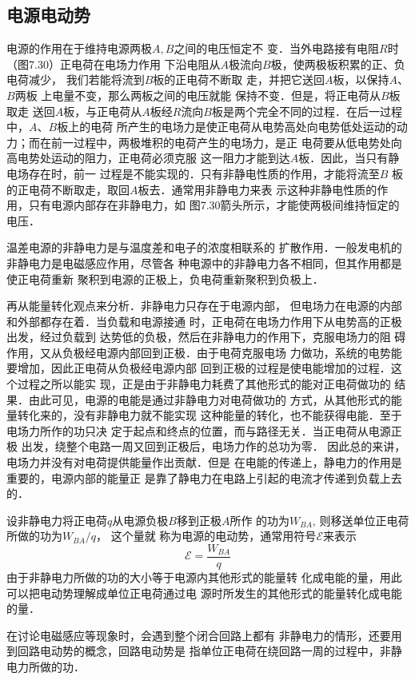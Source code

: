 \subsection{电源电动势}
电源的作用在于维持电源两极$A,B$之间的电压恒定不
变．当外电路接有电阻$R$时（图7.30）正电荷在电场力作用
下沿电阻从$A$极流向$B$极，使两极板积累的正、负电荷减少，
我们若能将流到$B$板的正电荷不断取
走，并把它送回$A$板，以保持$A$、$B$两板
上电量不变，那么两板之间的电压就能
保持不变．但是，将正电荷从$B$板取走
送回$A$板，与正电荷从$A$板经$R$流向$B$板是两个完全不同的过程．在后一过程中，$A$、$B$板上的电荷
所产生的电场力是使正电荷从电势高处向电势低处运动的动
力；而在前一过程中，两极堆积的电荷产生的电场力，是正
电荷要从低电势处向高电势处运动的阻力，正电荷必须克服
这一阻力才能到达$A$板．因此，当只有静电场存在时，前一
过程是不能实现的．只有非静电性质的作用，才能将流至$B$
板的正电荷不断取走，取回$A$板去．通常用非静电力来表
示这种非静电性质的作用，只有电源内部存在非静电力，如
图7.30箭头所示，才能使两极间维持恒定的电压．

温差电源的非静电力是与温度差和电子的浓度相联系的
扩散作用．一般发电机的非静电力是电磁感应作用，尽管各
种电源中的非静电力各不相同，但其作用都是使正电荷重新
聚积到电源的正极上，负电荷重新聚积到负极上．

再从能量转化观点来分析．非静电力只存在于电源内部，
但电场力在电源的内部和外部都存在着．当负载和电源接通
时，正电荷在电场力作用下从电势高的正极出发，经过负载到
达势低的负极，然后在非静电力的作用下，克服电场力的阻
碍作用，又从负极经电源内部回到正极．由于电荷克服电场
力做功，系统的电势能要增加，因此正电荷从负极经电源内部
回到正极的过程是使电能增加的过程．这个过程之所以能实
现，正是由于非静电力耗费了其他形式的能对正电荷做功的
结果．由此可见，电源的电能是通过非静电力对电荷做功的
方式，从其他形式的能量转化来的，没有非静电力就不能实现
这种能量的转化，也不能获得电能．至于电场力所作的功只决
定于起点和终点的位置，而与路径无关．当正电荷从电源正极
出发，绕整个电路一周又回到正极后，电场力作的总功为零．
因此总的来讲，电场力并没有对电荷提供能量作出贡献．但是
在电能的传递上，静电力的作用是重要的，电源内部的能量正
是靠了静电力在电路上引起的电流才传递到负载上去的．

设非静电力将正电荷$q$从电源负极$B$移到正极$A$所作
的功为$W_{BA}$, 则移送单位正电荷所做的功为$W_{BA}/q$，
这个量就
称为电源的电动势，通常用符号$\mathcal{E}$来表示
\[\mathcal{E}=\frac{W_{BA}}{q}\]
由于非静电力所做的功的大小等于电源内其他形式的能量转
化成电能的量，用此可以把电动势理解成单位正电荷通过电
源时所发生的其他形式的能量转化成电能的量．

在讨论电磁感应等现象时，会遇到整个闭合回路上都有
非静电力的情形，还要用到回路电动势的概念，回路电动势是
指单位正电荷在绕回路一周的过程中，非静电力所做的功．

